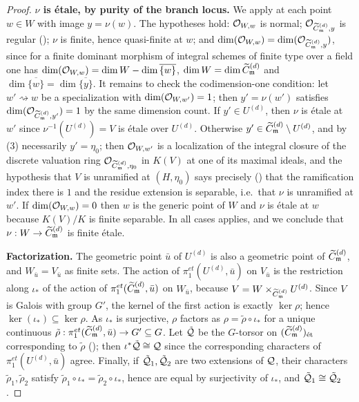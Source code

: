 \begin{proof}
    \textbf{$\nu$ is \'etale, by purity of the branch locus.}
    We apply  at each point $w \in W$ with image $y = \nu(w)$. The hypotheses hold:
    $\mathcal{O}_{W,w}$ is normal; $\mathcal{O}_{\widetilde{C}_{\mathfrak{m}}^{(d)},y}$ is regular ();
    $\nu$ is finite, hence quasi-finite at $w$; and
    $\dim(\mathcal{O}_{W,w}) = \dim(\mathcal{O}_{\widetilde{C}_{\mathfrak{m}}^{(d)},y})$, since for a finite dominant morphism of integral schemes
    of finite type over a field one has
    $\dim(\mathcal{O}_{W,w}) = \dim W - \dim \overline{\{w\}}$, $\dim W = \dim \widetilde{C}_{\mathfrak{m}}^{(d)}$ and
    $\dim \overline{\{w\}} = \dim \overline{\{y\}}$.
    It remains to check the codimension-one condition: let $w' \rightsquigarrow w$ be a specialization
    with $\dim(\mathcal{O}_{W, w'}) = 1$; then $y' = \nu(w')$ satisfies $\dim(\mathcal{O}_{\widetilde{C}_{\mathfrak{m}}^{(d)}, y'}) = 1$
    by the same dimension count. If $y' \in U^{(d)}$, then $\nu$ is \'etale at $w'$ since
    $\nu^{-1}(U^{(d)}) = V$ is \'etale over $U^{(d)}$. Otherwise
    $y' \in \widetilde{C}_{\mathfrak{m}}^{(d)} \setminus U^{(d)}$, and by (3) necessarily
    $y' = \eta_0$; then $\mathcal{O}_{W, w'}$ is a localization of the integral closure of the discrete valuation
    ring $\mathcal{O}_{\widetilde{C}_{\mathfrak{m}}^{(d)},\eta_0}$ in $K(V)$ at one of its maximal ideals, and the hypothesis that $V$ is
    unramified at $(H, \eta_0)$ says precisely () that the
    ramification index there is $1$ and the residue extension is separable, i.e.\ that $\nu$ is
    unramified at $w'$. If $\dim(\mathcal{O}_{W,w}) = 0$ then $w$ is the generic point of $W$ and $\nu$ is \'etale
    at $w$ because $K(V)/K$ is finite separable. In all cases  applies, and we conclude
    that $\nu : W \to \widetilde{C}_{\mathfrak{m}}^{(d)}$ is finite \'etale.

    \textbf{Factorization.}
    The geometric point $\bar{u}$ of $U^{(d)}$ is also a geometric point of $\widetilde{C}_{\mathfrak{m}}^{(d)}$, and
    $W_{\bar{u}} = V_{\bar{u}}$ as finite sets. The action of $\pi_1^{et}(U^{(d)}, \bar u)$ on
    $V_{\bar u}$ is the restriction along $\iota_*$ of the action of $\pi_1^{et}(\widetilde{C}_{\mathfrak{m}}^{(d)}, \bar u)$ on
    $W_{\bar u}$, because $V = W \times_{\widetilde{C}_{\mathfrak{m}}^{(d)}} U^{(d)}$. Since $V$ is Galois with group $G'$, the
    kernel of the first action is exactly $\ker \rho$; hence
    $\ker(\iota_*) \subseteq \ker \rho$. As $\iota_*$ is surjective, $\rho$ factors as
    $\rho = \tilde{\rho} \circ \iota_*$ for a unique continuous
    $\tilde{\rho} : \pi_1^{et}(\widetilde{C}_{\mathfrak{m}}^{(d)}, \bar u) \to G' \subseteq G$.
    Let $\tilde{\mathcal{Q}}$ be the $G$-torsor on $(\widetilde{C}_{\mathfrak{m}}^{(d)})_{\text{\'et}}$ corresponding to $\tilde{\rho}$
    (); then
    $\iota^* \tilde{\mathcal{Q}} \cong \mathcal{Q}$ since the corresponding characters of $\pi_1^{et}(U^{(d)}, \bar u)$
    agree. Finally, if $\tilde{\mathcal{Q}}_1, \tilde{\mathcal{Q}}_2$ are two extensions of $\mathcal{Q}$, their characters
    $\tilde{\rho}_1, \tilde{\rho}_2$ satisfy $\tilde{\rho}_1 \circ \iota_* = \tilde{\rho}_2 \circ \iota_*$,
    hence are equal by surjectivity of $\iota_*$, and $\tilde{\mathcal{Q}}_1 \cong \tilde{\mathcal{Q}}_2$.
\end{proof}

